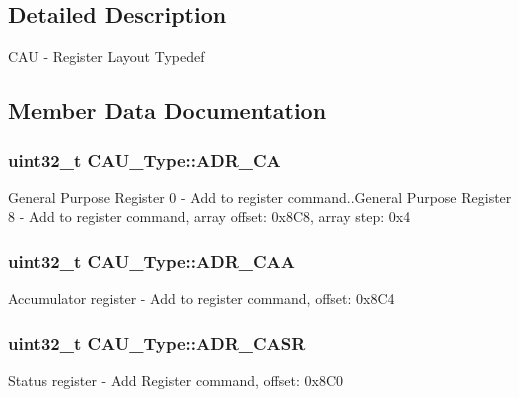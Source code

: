 \subsection{Detailed Description}
C\+AU -\/ Register Layout Typedef 

\subsection{Member Data Documentation}
\subsubsection[{\texorpdfstring{A\+D\+R\+\_\+\+CA}{ADR_CA}}]{ uint32\+\_\+t C\+A\+U\+\_\+\+Type\+::\+A\+D\+R\+\_\+\+CA}\hypertarget{structCAU__Type_a1e7bbb2f726a2b2fdb9689eed01ecc96}{}\label{structCAU__Type_a1e7bbb2f726a2b2fdb9689eed01ecc96}
General Purpose Register 0 -\/ Add to register command..General Purpose Register 8 -\/ Add to register command, array offset\+: 0x8\+C8, array step\+: 0x4 
\subsubsection[{\texorpdfstring{A\+D\+R\+\_\+\+C\+AA}{ADR_CAA}}]{ uint32\+\_\+t C\+A\+U\+\_\+\+Type\+::\+A\+D\+R\+\_\+\+C\+AA}\hypertarget{structCAU__Type_ac5a11025c0def52c0d510c9c13cc7949}{}\label{structCAU__Type_ac5a11025c0def52c0d510c9c13cc7949}
Accumulator register -\/ Add to register command, offset\+: 0x8\+C4 
\subsubsection[{\texorpdfstring{A\+D\+R\+\_\+\+C\+A\+SR}{ADR_CASR}}]{ uint32\+\_\+t C\+A\+U\+\_\+\+Type\+::\+A\+D\+R\+\_\+\+C\+A\+SR}\hypertarget{structCAU__Type_ace1485e8e1bd2ec5d472bb4af7d242c4}{}\label{structCAU__Type_ace1485e8e1bd2ec5d472bb4af7d242c4}
Status register -\/ Add Register command, offset\+: 0x8\+C0 
